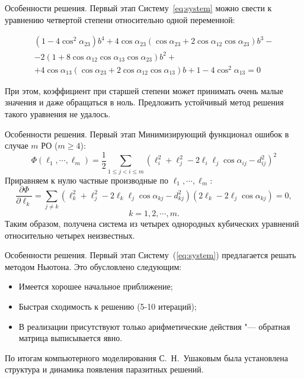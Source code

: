 \documentclass[russian,hyperref={unicode}]{beamer}
\begin{document}
  \begin{frame}{Особенности решения. Первый этап}
    Систему~\eqref{eq:system} можно свести к уравнению четвертой степени относительно одной переменной:

    \begin{multline*}
      \left(1-4 \cos^2 \alpha_{23}\right) b^4 + 4 \cos \alpha_{23} \left(\cos \alpha_{23} + 2 \cos \alpha_{12} \cos \alpha_{23} \right) b^3 - \\
      - 2 \left(1 + 8 \cos \alpha_{12} \cos \alpha_{13} \cos \alpha_{23}\right) b^2 + \\
      + 4 \cos \alpha_{13} \left(\cos \alpha_{23} + 2 \cos \alpha_{12} \cos \alpha_{13}\right) b + 1-4 \cos^2 \alpha_{13} = 0
    \end{multline*}

    При этом, коэффициент при старшей степени может принимать очень малые значения и даже обращаться в ноль. Предложить устойчивый метод решения такого уравнения не удалось.
  \end{frame}

  \begin{frame}{Особенности решения. Первый этап}
    Минимизирующий функционал ошибок в случае $m$ РО ($m \ge 4$):
    \begin{equation*}
      \Phi\left(\ell_1, \cdots, \ell_m \right) = \frac{1}{2}\sum_{1 \leq j < i \leq m} \left(\ell_i^2 + \ell_j^2 - 2 \ell_i \ell_j \cos\alpha_{ij} - d_{ij}^2\right)^2
    \end{equation*}
    Приравняем к нулю частные производные по $\ell_1, \cdots, \ell_m$:
    \begin{equation*}
      \frac{\partial\Phi}{\partial\ell_k} = \sum_{j \ne k} \left(\ell_k^2 + \ell_j^2 - 2 \ell_k \ell_j \cos\alpha_{kj} - d_{kj}^2\right)\left(2 \ell_k - 2 \ell_j \cos\alpha_{kj}\right) = 0,
    \end{equation*}
    \begin{equation*}
      k = 1, 2, \cdots, m.
    \end{equation*}
    Таким образом, получена система из четырех однородных кубических уравнений относительно четырех неизвестных.
  \end{frame}

  \begin{frame}{Особенности решения. Первый этап}
    Систему~(\ref{eq:system}) предлагается решать методом Ньютона. Это обусловлено следующим:
    \begin{itemize}
      \item Имеется хорошее начальное приближение;
      \item Быстрая сходимость к решению (5-10 итераций);
      \item В реализации присутствуют только арифметические действия "--- обратная матрица выписывается явно.
    \end{itemize}

    По итогам компьютерного моделирования С.~Н.~Ушаковым была установлена структура и динамика появления паразитных решений.
  \end{frame}
\end{document}
